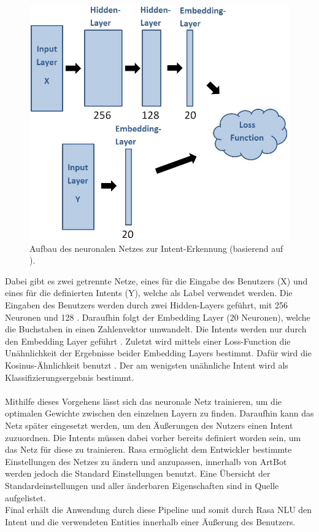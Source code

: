 \begin{figure}[htbp]
	\centerline{\includegraphics[width=0.8\linewidth]{figures/star.jpg}}
	\caption{Aufbau des neuronalen Netzes zur Intent-Erkennung (basierend auf \cite{ftech}).}
	\label{star}
\end{figure}
Dabei gibt es zwei getrennte Netze, eines für die Eingabe des Benutzers (X) und eines für die definierten Intents (Y), welche als Label verwendet werden. Die Eingaben des Benutzers werden durch zwei Hidden-Layers geführt, mit 256 Neuronen und 128 \cite{ftech}. Daraufhin folgt der Embedding Layer (20 Neuronen), welche die Buchstaben in einen Zahlenvektor umwandelt. Die Intents werden nur durch den Embedding Layer geführt \cite{ftech}. Zuletzt wird mittels einer Loss-Function die Unähnlichkeit der Ergebnisse beider Embedding Layers bestimmt. Dafür wird die Kosinus-Ähnlichkeit benutzt \cite{ftech}. Der am wenigsten unähnliche Intent wird als Klassifizierungsergebnis bestimmt.\\
\\
Mithilfe dieses Vorgehens lässt sich das neuronale Netz trainieren, um die optimalen Gewichte zwischen den einzelnen Layern zu finden. Daraufhin kann das Netz später eingesetzt werden, um den Äußerungen des Nutzers einen Intent zuzuordnen. Die Intents müssen dabei vorher bereits definiert worden sein, um das Netz für diese zu trainieren. Rasa ermöglicht dem Entwickler bestimmte Einstellungen des Netzes zu ändern und anzupassen, innerhalb von ArtBot werden jedoch die Standard Einstellungen benutzt. Eine Übersicht der Standardeinstellungen und aller änderbaren Eigenschaften sind in Quelle \cite{embedd} aufgelistet.\\
Final erhält die Anwendung durch diese Pipeline und somit durch Rasa NLU den Intent und die verwendeten Entities innerhalb einer Äußerung des Benutzers.

